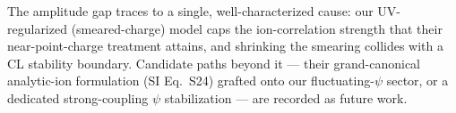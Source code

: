 \documentclass[10pt]{article}
\begin{document}
\noindent The amplitude gap traces to a single, well-characterized cause:
our UV-regularized (smeared-charge) model caps the ion-correlation
strength that their near-point-charge treatment attains, and shrinking the
smearing collides with a CL stability boundary. Candidate paths beyond it
--- their grand-canonical analytic-ion formulation (SI Eq.~S24) grafted
onto our fluctuating-$\psi$ sector, or a dedicated strong-coupling
$\psi$ stabilization --- are recorded as future work.
\end{document}
